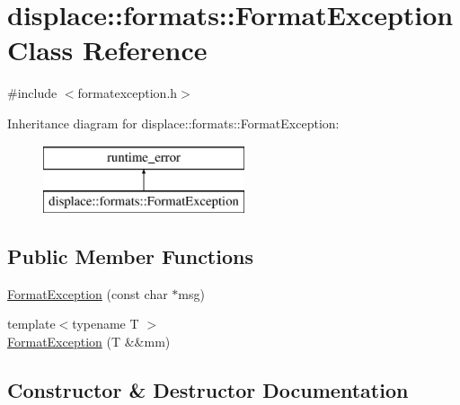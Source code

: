 \hypertarget{classdisplace_1_1formats_1_1_format_exception}{}\section{displace\+::formats\+::Format\+Exception Class Reference}
\label{classdisplace_1_1formats_1_1_format_exception}


{\ttfamily \#include $<$formatexception.\+h$>$}

Inheritance diagram for displace\+::formats\+::Format\+Exception\+:\begin{figure}[H]
\begin{center}
\leavevmode
\includegraphics[height=2.000000cm]{de/d4e/classdisplace_1_1formats_1_1_format_exception}
\end{center}
\end{figure}
\subsection*{Public Member Functions}
\begin{DoxyCompactItemize}
\item 
\mbox{\hyperlink{classdisplace_1_1formats_1_1_format_exception_a689a10feaec23b378f9be327b8f06e30}{Format\+Exception}} (const char $\ast$msg)
\item 
{\footnotesize template$<$typename T $>$ }\\\mbox{\hyperlink{classdisplace_1_1formats_1_1_format_exception_a3ca9e058a9404af4e2c1b4577864b4f6}{Format\+Exception}} (T \&\&mm)
\end{DoxyCompactItemize}


\subsection{Constructor \& Destructor Documentation}
\mbox{\label{classdisplace_1_1formats_1_1_format_exception_a689a10feaec23b378f9be327b8f06e30}} 
